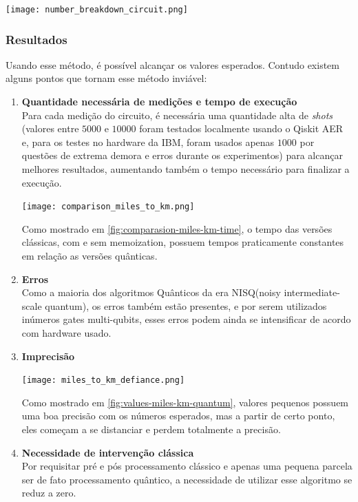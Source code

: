 \documentclass{article}
\begin{document}
\begin{center}
	\texttt{[image: number\_breakdown\_circuit.png]}
	\label{fig:miles-km-circuit}
\end{center}

\subsubsection{Resultados}
Usando esse método, é possível alcançar os valores esperados. Contudo existem alguns pontos que tornam esse método inviável:

\begin{enumerate}

\item{\textbf{Quantidade necessária de medições e tempo de execução}}\\
Para cada medição do circuito, é necessária uma quantidade alta de \emph{shots} (valores entre $5000$ e $10000$ foram testados localmente usando o Qiskit AER e, para os testes no hardware da IBM, foram usados apenas $1000$ por questões de extrema demora e erros durante os experimentos) para alcançar melhores resultados, aumentando também o tempo necessário para finalizar a execução.

\begin{center}
	\texttt{[image: comparison\_miles\_to\_km.png]}
	\label{fig:comparasion-miles-km-time}
\end{center}

Como mostrado em \ref{fig:comparasion-miles-km-time}, o tempo das versões clássicas, com e sem memoization, possuem tempos praticamente constantes em relação as versões quânticas.


\item{\textbf{Erros}}\\
Como a maioria dos algoritmos Quânticos da era NISQ(noisy intermediate-scale quantum), os erros também estão presentes, e por serem utilizados inúmeros gates multi-qubits, esses erros podem ainda se intensificar de acordo com hardware usado.

\item{\textbf{Imprecisão}}\\
\begin{center}
	\texttt{[image: miles\_to\_km\_defiance.png]}
	\label{fig:values-miles-km-quantum}
\end{center}

Como mostrado em \ref{fig:values-miles-km-quantum}, valores pequenos possuem uma boa precisão com os números esperados, mas a partir de certo ponto, eles começam a se distanciar e perdem totalmente a precisão.

\item{\textbf{Necessidade de intervenção clássica}}\\
Por requisitar pré e pós processamento clássico e apenas uma pequena parcela ser de fato processamento quântico, a necessidade de utilizar esse algoritmo se reduz a zero. 

\end{enumerate}
\end{document}
